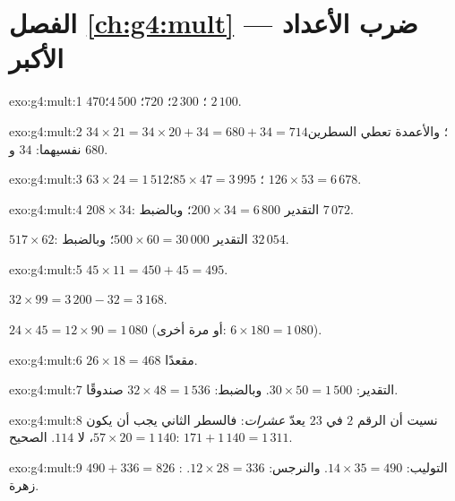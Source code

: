 \section*{الفصل \ref{ch:g4:mult} --- ضرب الأعداد الأكبر}

\begin{solution}{exo:g4:mult:1}
$470$؛ \quad $2\,300$؛ \quad $720$؛ \quad $4\,500$؛ \quad
$2\,100$.
\end{solution}

\begin{solution}{exo:g4:mult:2}
$34 \times 21 = 34 \times 20 + 34 = 680 + 34 = 714$؛ والأعمدة
تعطي السطرين نفسيهما: $34$ و $680$.
\end{solution}

\begin{solution}{exo:g4:mult:3}
$63 \times 24 = 1\,512$؛ \quad
$85 \times 47 = 3\,995$؛ \quad
$126 \times 53 = 6\,678$.
\end{solution}

\begin{solution}{exo:g4:mult:4}
$208 \times 34$: التقدير $200 \times 34 = 6\,800$؛ وبالضبط
$7\,072$.

$517 \times 62$: التقدير $500 \times 60 = 30\,000$؛ وبالضبط
$32\,054$.
\end{solution}

\begin{solution}{exo:g4:mult:5}
$45 \times 11 = 450 + 45 = 495$.

$32 \times 99 = 3\,200 - 32 = 3\,168$.

$24 \times 45 = 12 \times 90 = 1\,080$ (أو مرة أخرى:
$6 \times 180 = 1\,080$).
\end{solution}

\begin{solution}{exo:g4:mult:6}
$26 \times 18 = 468$ مقعدًا.
\end{solution}

\begin{solution}{exo:g4:mult:7}
التقدير: $30 \times 50 = 1\,500$. وبالضبط:
$32 \times 48 = 1\,536$ صندوقًا.
\end{solution}

\begin{solution}{exo:g4:mult:8}
نسيت أن الرقم $2$ في $23$ يعدّ \emph{عشرات}: فالسطر الثاني
يجب أن يكون $57 \times 20 = 1\,140$، لا $114$.  الصحيح:
$171 + 1\,140 = 1\,311$.
\end{solution}

\begin{solution}{exo:g4:mult:9}
التوليب: $14 \times 35 = 490$. والنرجس: $12 \times 28 = 336$.
: $490 + 336 = 826$ زهرة.
\end{solution}

